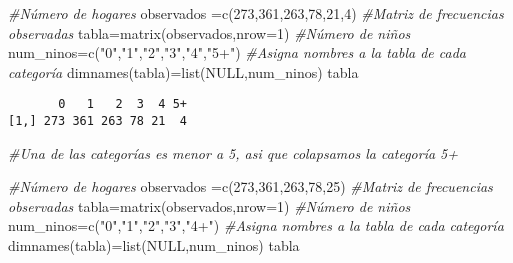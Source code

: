 \documentclass[
  a4paper,
  oneside,
  openany]{book}
\newenvironment{Shaded}{\begin{snugshade}}{\end{snugshade}}
\newcommand{\AttributeTok}[1]{\textcolor[rgb]{0.77,0.63,0.00}{#1}}
\newcommand{\CommentTok}[1]{\textcolor[rgb]{0.56,0.35,0.01}{\textit{#1}}}
\newcommand{\ConstantTok}[1]{\textcolor[rgb]{0.00,0.00,0.00}{#1}}
\newcommand{\DecValTok}[1]{\textcolor[rgb]{0.00,0.00,0.81}{#1}}
\newcommand{\FunctionTok}[1]{\textcolor[rgb]{0.00,0.00,0.00}{#1}}
\newcommand{\NormalTok}[1]{#1}
\newcommand{\OtherTok}[1]{\textcolor[rgb]{0.56,0.35,0.01}{#1}}
\newcommand{\StringTok}[1]{\textcolor[rgb]{0.31,0.60,0.02}{#1}}
\begin{document}
\begin{Shaded}
\begin{Highlighting}[]
\CommentTok{\#Número de hogares}
\NormalTok{observados }\OtherTok{=}\FunctionTok{c}\NormalTok{(}\DecValTok{273}\NormalTok{,}\DecValTok{361}\NormalTok{,}\DecValTok{263}\NormalTok{,}\DecValTok{78}\NormalTok{,}\DecValTok{21}\NormalTok{,}\DecValTok{4}\NormalTok{) }
\CommentTok{\#Matriz de frecuencias observadas}
\NormalTok{tabla}\OtherTok{=}\FunctionTok{matrix}\NormalTok{(observados,}\AttributeTok{nrow=}\DecValTok{1}\NormalTok{)}
\CommentTok{\#Número de niños}
\NormalTok{num\_ninos}\OtherTok{=}\FunctionTok{c}\NormalTok{(}\StringTok{"0"}\NormalTok{,}\StringTok{"1"}\NormalTok{,}\StringTok{"2"}\NormalTok{,}\StringTok{"3"}\NormalTok{,}\StringTok{"4"}\NormalTok{,}\StringTok{"5+"}\NormalTok{)}
\CommentTok{\#Asigna nombres a la tabla de cada categoría}
\FunctionTok{dimnames}\NormalTok{(tabla)}\OtherTok{=}\FunctionTok{list}\NormalTok{(}\ConstantTok{NULL}\NormalTok{,num\_ninos)}
\NormalTok{tabla}
\end{Highlighting}
\end{Shaded}

\begin{verbatim}
       0   1   2  3  4 5+
[1,] 273 361 263 78 21  4
\end{verbatim}

\begin{Shaded}
\begin{Highlighting}[]
\CommentTok{\#Una de las categorías es menor a 5, asi que colapsamos la categoría 5+}

\CommentTok{\#Número de hogares}
\NormalTok{observados }\OtherTok{=}\FunctionTok{c}\NormalTok{(}\DecValTok{273}\NormalTok{,}\DecValTok{361}\NormalTok{,}\DecValTok{263}\NormalTok{,}\DecValTok{78}\NormalTok{,}\DecValTok{25}\NormalTok{)}
\CommentTok{\#Matriz de frecuencias observadas}
\NormalTok{tabla}\OtherTok{=}\FunctionTok{matrix}\NormalTok{(observados,}\AttributeTok{nrow=}\DecValTok{1}\NormalTok{)}
\CommentTok{\#Número de niños}
\NormalTok{num\_ninos}\OtherTok{=}\FunctionTok{c}\NormalTok{(}\StringTok{"0"}\NormalTok{,}\StringTok{"1"}\NormalTok{,}\StringTok{"2"}\NormalTok{,}\StringTok{"3"}\NormalTok{,}\StringTok{"4+"}\NormalTok{)}
\CommentTok{\#Asigna nombres a la tabla de cada categoría}
\FunctionTok{dimnames}\NormalTok{(tabla)}\OtherTok{=}\FunctionTok{list}\NormalTok{(}\ConstantTok{NULL}\NormalTok{,num\_ninos)}
\NormalTok{tabla}
\end{Highlighting}
\end{Shaded}
\end{document}
